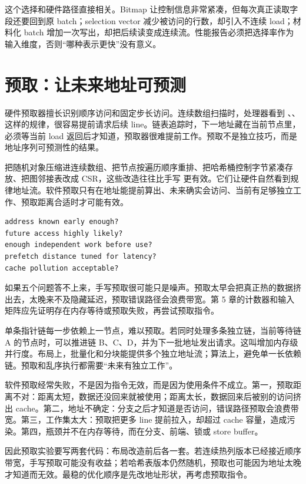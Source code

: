 这个选择和硬件路径直接相关。Bitmap 让控制信息非常紧凑，但每次真正读取字段还要回到原 batch；selection vector 减少被访问的行数，却引入不连续 load；材料化 batch 增加一次写出，却把后续读变成连续流。性能报告必须把选择率作为输入维度，否则“哪种表示更快”没有意义。

\section{预取：让未来地址可预测}

硬件预取器擅长识别顺序访问和固定步长访问。连续数组扫描时，处理器看到 、、 这样的规律，很容易提前请求后续 line。链表追踪时，下一地址藏在当前节点里，必须等当前 load 返回后才知道，预取器很难提前工作。预取不是独立技巧，而是地址序列可预测性的结果。

把随机对象压缩进连续数组、把节点按遍历顺序重排、把哈希桶控制字节紧凑存放、把图邻接表改成 CSR，这些改造往往比手写  更有效。它们让硬件自然看到规律地址流。软件预取只有在地址能提前算出、未来确实会访问、当前有足够独立工作、预取距离合适时才可能有效。

\begin{lstlisting}[numbers=none,caption={预取是否可能有效的判断}]
address known early enough?
future access highly likely?
enough independent work before use?
prefetch distance tuned for latency?
cache pollution acceptable?
\end{lstlisting}

如果五个问题答不上来，手写预取很可能只是噪声。预取太早会把真正热的数据挤出去，太晚来不及隐藏延迟，预取错误路径会浪费带宽。第 5 章的计数器和输入矩阵应先证明存在内存等待或预取失败，再尝试预取指令。

单条指针链每一步依赖上一节点，难以预取。若同时处理多条独立链，当前等待链 A 的节点时，可以推进链 B、C、D，并为下一批地址发出请求。这叫增加内存级并行度。布局上，批量化和分块能提供多个独立地址流；算法上，避免单一长依赖链。预取和乱序执行都需要“未来有独立工作”。

软件预取经常失败，不是因为指令无效，而是因为使用条件不成立。第一，预取距离不对：距离太短，数据还没回来就被使用；距离太长，数据回来后被别的访问挤出 cache。第二，地址不确定：分支之后才知道是否访问，错误路径预取会浪费带宽。第三，工作集太大：预取把更多 line 提前拉入，却超过 cache 容量，造成污染。第四，瓶颈并不在内存等待，而在分支、前端、锁或 store buffer。

因此预取实验要写两套代码：布局改造前后各一套。若连续热列版本已经接近顺序带宽，手写预取可能没有收益；若哈希表版本仍然随机，预取也可能因为地址太晚才知道而无效。最稳的优化顺序是先改地址形状，再考虑预取指令。

